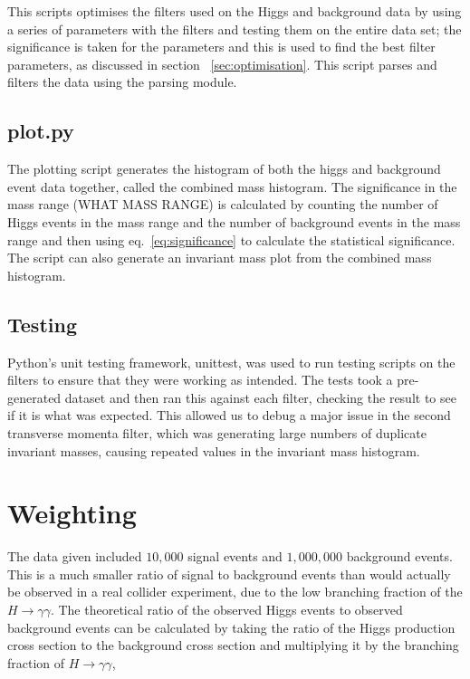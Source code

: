 \documentclass[11pt]{amsart}
\begin{document}
\begin{multicols}{2}
This scripts optimises the filters used on the Higgs and background data by using a series of parameters with the filters and testing them on the entire data set; the significance is taken for the parameters and this is used to find the best filter parameters, as discussed in section ~\ref{sec:optimisation}. This script parses and filters the data using the parsing module.

\subsection{plot.py}

The plotting script generates the histogram of both the higgs and background event data together, called the combined mass histogram. The significance in the mass range (WHAT MASS RANGE) is calculated by counting the number of Higgs events in the mass range and the number of background events in the mass range and then using eq.~\ref{eq:significance} to calculate the statistical significance. The script can also generate an invariant mass plot from the combined mass histogram.

\subsection{Testing}
\label{sec:testing}

Python's unit testing framework, unittest, was used to run testing scripts on the filters to ensure that they were working as intended. The tests took a pre-generated dataset and then ran this against each filter, checking the result to see if it is what was expected. This allowed us to debug a major issue in the second transverse momenta filter, which was generating large numbers of duplicate invariant masses, causing repeated values in the invariant mass histogram.

\section{Weighting}

The data given included $10,000$ signal events and $1,000,000$ background events. This is a much smaller ratio of signal to background events than would actually be observed in a real collider experiment, due to the low branching fraction of the $H \to \gamma\gamma$. The theoretical ratio of the observed Higgs events to observed background events can be calculated by taking the ratio of the Higgs production cross section to the background cross section and multiplying it by the branching fraction of $H \to \gamma\gamma$,


\end{multicols}
\end{document}
